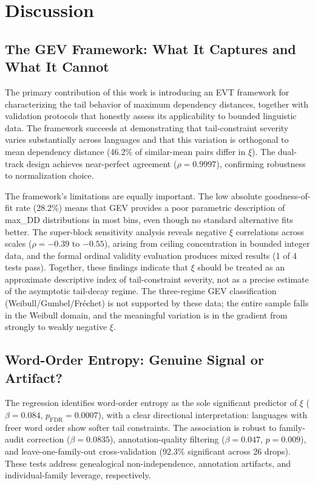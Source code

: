 \documentclass[11pt,letterpaper]{article}
\begin{document}
\section{Discussion}\label{sec:discussion}

\subsection{The GEV Framework: What It Captures and What It Cannot}

The primary contribution of this work is introducing an EVT framework for characterizing the tail behavior of maximum dependency distances, together with validation protocols that honestly assess its applicability to bounded linguistic data. The framework succeeds at demonstrating that tail-constraint severity varies substantially across languages and that this variation is orthogonal to mean dependency distance (46.2\% of similar-mean pairs differ in $\xi$). The dual-track design achieves near-perfect agreement ($\rho = 0.9997$), confirming robustness to normalization choice.

The framework's limitations are equally important. The low absolute goodness-of-fit rate (28.2\%) means that GEV provides a poor parametric description of max\_DD distributions in most bins, even though no standard alternative fits better. The super-block sensitivity analysis reveals negative $\xi$ correlations across scales ($\rho = -0.39$ to $-0.55$), arising from ceiling concentration in bounded integer data, and the formal ordinal validity evaluation produces mixed results (1 of 4 tests pass). Together, these findings indicate that $\xi$ should be treated as an approximate descriptive index of tail-constraint severity, not as a precise estimate of the asymptotic tail-decay regime. The three-regime GEV classification (Weibull/Gumbel/Fr\'echet) is not supported by these data; the entire sample falls in the Weibull domain, and the meaningful variation is in the gradient from strongly to weakly negative $\xi$.

\subsection{Word-Order Entropy: Genuine Signal or Artifact?}

The regression identifies word-order entropy as the sole significant predictor of $\xi$ ($\beta = 0.084$, $p_{\text{FDR}} = 0.0007$), with a clear directional interpretation: languages with freer word order show softer tail constraints. The association is robust to family-audit correction ($\beta = 0.0835$), annotation-quality filtering ($\beta = 0.047$, $p = 0.009$), and leave-one-family-out cross-validation (92.3\% significant across 26 drops). These tests address genealogical non-independence, annotation artifacts, and individual-family leverage, respectively.
\end{document}
